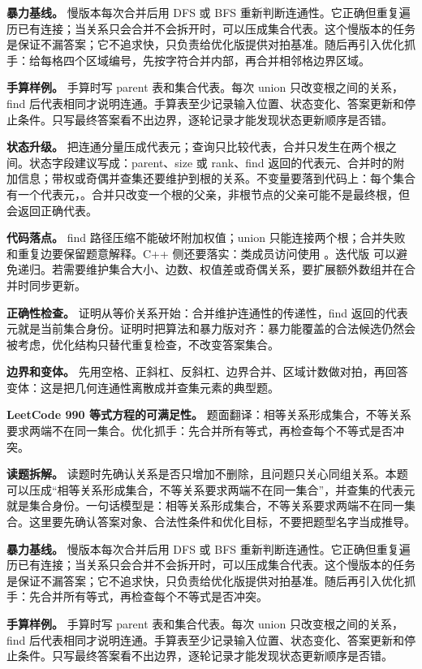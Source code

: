 \textbf{暴力基线。} 慢版本每次合并后用 DFS 或 BFS 重新判断连通性。它正确但重复遍历已有连接；当关系只会合并不会拆开时，可以压成集合代表。这个慢版本的任务是保证不漏答案；它不追求快，只负责给优化版提供对拍基准。随后再引入优化抓手：给每格四个区域编号，先按字符合并内部，再合并相邻格边界区域。

\textbf{手算样例。} 手算时写 parent 表和集合代表。每次 union 只改变根之间的关系，find 后代表相同才说明连通。手算表至少记录输入位置、状态变化、答案更新和停止条件。只写最终答案看不出边界，逐轮记录才能发现状态更新顺序是否错。

\textbf{状态升级。} 把连通分量压成代表元；查询只比较代表，合并只发生在两个根之间。状态字段建议写成：parent、size 或 rank、find 返回的代表元、合并时的附加信息；带权或奇偶并查集还要维护到根的关系。不变量要落到代码上：每个集合有一个代表元，。合并只改变一个根的父亲，非根节点的父亲可能不是最终根，但  会返回正确代表。

\textbf{代码落点。} find 路径压缩不能破坏附加权值；union 只能连接两个根；合并失败和重复边要保留题意解释。C++ 侧还要落实：类成员访问使用 。迭代版  可以避免递归。若需要维护集合大小、边数、权值差或奇偶关系，要扩展额外数组并在合并时同步更新。

\textbf{正确性检查。} 证明从等价关系开始：合并维护连通性的传递性，find 返回的代表元就是当前集合身份。证明时把算法和暴力版对齐：暴力能覆盖的合法候选仍然会被考虑，优化结构只替代重复检查，不改变答案集合。

\textbf{边界和变体。} 先用空格、正斜杠、反斜杠、边界合并、区域计数做对拍，再回答变体：这是把几何连通性离散成并查集元素的典型题。

\noindent\textbf{LeetCode 990 等式方程的可满足性。} 题面翻译：相等关系形成集合，不等关系要求两端不在同一集合。优化抓手：先合并所有等式，再检查每个不等式是否冲突。

\textbf{读题拆解。} 读题时先确认关系是否只增加不删除，且问题只关心同组关系。本题可以压成“相等关系形成集合，不等关系要求两端不在同一集合”，并查集的代表元就是集合身份。一句话模型是：相等关系形成集合，不等关系要求两端不在同一集合。这里要先确认答案对象、合法性条件和优化目标，不要把题型名字当成推导。

\textbf{暴力基线。} 慢版本每次合并后用 DFS 或 BFS 重新判断连通性。它正确但重复遍历已有连接；当关系只会合并不会拆开时，可以压成集合代表。这个慢版本的任务是保证不漏答案；它不追求快，只负责给优化版提供对拍基准。随后再引入优化抓手：先合并所有等式，再检查每个不等式是否冲突。

\textbf{手算样例。} 手算时写 parent 表和集合代表。每次 union 只改变根之间的关系，find 后代表相同才说明连通。手算表至少记录输入位置、状态变化、答案更新和停止条件。只写最终答案看不出边界，逐轮记录才能发现状态更新顺序是否错。

